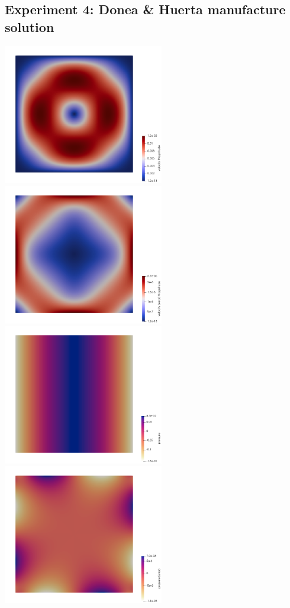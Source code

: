 \newpage
\subsection*{Experiment 4: Donea \& Huerta manufacture solution}

\begin{center}
\includegraphics[width=7cm]{python_codes/fieldstone_158/results/exp4/vel}
\includegraphics[width=7cm]{python_codes/fieldstone_158/results/exp4/vel_error}\\
\includegraphics[width=7cm]{python_codes/fieldstone_158/results/exp4/press}
\includegraphics[width=7cm]{python_codes/fieldstone_158/results/exp4/press_error}\\

\end{center}
